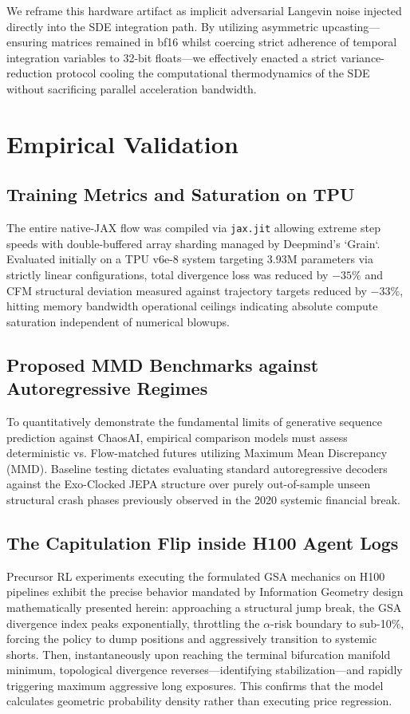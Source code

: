 \documentclass[11pt]{article}
\begin{document}
We reframe this hardware artifact as implicit adversarial Langevin noise injected directly into the SDE integration path. By utilizing asymmetric upcasting—ensuring matrices remained in bf16 whilst coercing strict adherence of temporal integration variables to 32-bit floats—we effectively enacted a strict variance-reduction protocol cooling the computational thermodynamics of the SDE without sacrificing parallel acceleration bandwidth. 

\section{Empirical Validation}

\subsection{Training Metrics and Saturation on TPU}
The entire native-JAX flow was compiled via \texttt{jax.jit} allowing extreme step speeds with double-buffered array sharding managed by Deepmind's `Grain`. Evaluated initially on a TPU v6e-8 system targeting 3.93M parameters via strictly linear configurations, total divergence loss was reduced by $-35\%$ and CFM structural deviation measured against trajectory targets reduced by $-33\%$, hitting memory bandwidth operational ceilings indicating absolute compute saturation independent of numerical blowups.

\subsection{Proposed MMD Benchmarks against Autoregressive Regimes}
To quantitatively demonstrate the fundamental limits of generative sequence prediction against ChaosAI, empirical comparison models must assess deterministic vs. Flow-matched futures utilizing Maximum Mean Discrepancy (MMD). Baseline testing dictates evaluating standard autoregressive decoders against the Exo-Clocked JEPA structure over purely out-of-sample unseen structural crash phases previously observed in the 2020 systemic financial break.

\subsection{The Capitulation Flip inside H100 Agent Logs}
Precursor RL experiments executing the formulated GSA mechanics on H100 pipelines exhibit the precise behavior mandated by Information Geometry design mathematically presented herein: approaching a structural jump break, the GSA divergence index peaks exponentially, throttling the $\alpha$-risk boundary to sub-10\%, forcing the policy to dump positions and aggressively transition to systemic shorts. Then, instantaneously upon reaching the terminal bifurcation manifold minimum, topological divergence reverses—identifying stabilization—and rapidly triggering maximum aggressive long exposures. This confirms that the model calculates geometric probability density rather than executing price regression.
\end{document}
